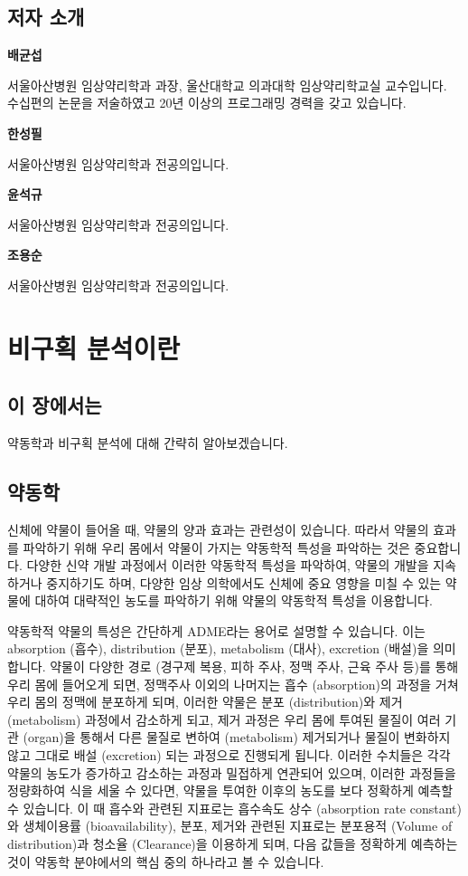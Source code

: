 \documentclass[12pt,]{krantz}
\theoremstyle{definition}
\theoremstyle{definition}
\theoremstyle{definition}
\theoremstyle{remark}
\begin{document}
\section*{저자 소개}\label{-}


\textbf{배균섭}

서울아산병원 임상약리학과 과장, 울산대학교 의과대학 임상약리학교실
교수입니다. 수십편의 논문을 저술하였고 20년 이상의 프로그래밍 경력을
갖고 있습니다.

\textbf{한성필}

서울아산병원 임상약리학과 전공의입니다.

\textbf{윤석규}

서울아산병원 임상약리학과 전공의입니다.

\textbf{조용순}

서울아산병원 임상약리학과 전공의입니다.

\mainmatter

\chapter{비구획 분석이란}\label{introduction}

\section{이 장에서는}\label{summary-introduction}

약동학과 비구획 분석에 대해 간략히 알아보겠습니다.

\section{약동학}\label{PK-introduction}

신체에 약물이 들어올 때, 약물의 양과 효과는 관련성이 있습니다. 따라서
약물의 효과를 파악하기 위해 우리 몸에서 약물이 가지는 약동학적 특성을
파악하는 것은 중요합니다. 다양한 신약 개발 과정에서 이러한 약동학적
특성을 파악하여, 약물의 개발을 지속하거나 중지하기도 하며, 다양한 임상
의학에서도 신체에 중요 영향을 미칠 수 있는 약물에 대하여 대략적인 농도를
파악하기 위해 약물의 약동학적 특성을 이용합니다.

약동학적 약물의 특성은 간단하게 ADME라는 용어로 설명할 수 있습니다. 이는
absorption (흡수), distribution (분포), metabolism (대사), excretion
(배설)을 의미합니다. 약물이 다양한 경로 (경구제 복용, 피하 주사, 정맥
주사, 근육 주사 등)를 통해 우리 몸에 들어오게 되면, 정맥주사 이외의
나머지는 흡수 (absorption)의 과정을 거쳐 우리 몸의 정맥에 분포하게 되며,
이러한 약물은 분포 (distribution)와 제거 (metabolism) 과정에서 감소하게
되고, 제거 과정은 우리 몸에 투여된 물질이 여러 기관 (organ)을 통해서
다른 물질로 변하여 (metabolism) 제거되거나 물질이 변화하지 않고 그대로
배설 (excretion) 되는 과정으로 진행되게 됩니다. 이러한 수치들은 각각
약물의 농도가 증가하고 감소하는 과정과 밀접하게 연관되어 있으며, 이러한
과정들을 정량화하여 식을 세울 수 있다면, 약물을 투여한 이후의 농도를
보다 정확하게 예측할 수 있습니다. 이 때 흡수와 관련된 지표로는 흡수속도
상수 (absorption rate constant)와 생체이용률 (bioavailability), 분포,
제거와 관련된 지표로는 분포용적 (Volume of distribution)과 청소율
(Clearance)을 이용하게 되며, 다음 값들을 정확하게 예측하는 것이 약동학
분야에서의 핵심 중의 하나라고 볼 수 있습니다.
\end{document}
